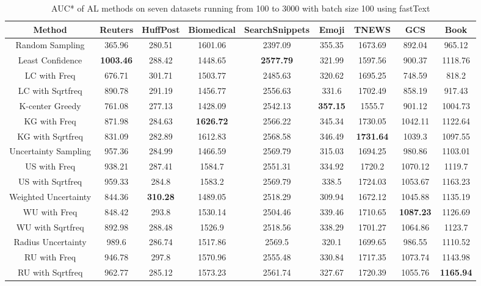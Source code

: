 \begin{table}[th]
	\centering
	\scriptsize
	\begin{tabular}{ccccccccc}
		\toprule
		Method & Reuters & HuffPost & Biomedical & SearchSnippets & Emoji & TNEWS & GCS & Book\\ \hline
		Random Sampling & 365.96 & 280.51 & 1601.06 & 2397.09 & 355.35 & 1673.69 & 892.04 & 965.12\\ \hline
		
		Least Confidence & \textbf{1003.46} & 288.42 & 1448.65 & \textbf{2577.79} & 321.99 & 1597.56 & 900.37 & 1118.76\\
		LC with Freq & 676.71 & 301.71 & 1503.77 & 2485.63 & 320.62 & 1695.25 & 748.59 & 818.2\\
		LC with Sqrtfreq & 890.78 & 291.19 & 1456.77 & 2556.63 & 331.6 & 1702.49 & 858.19 & 917.43\\  \hline
		
		K-center Greedy & 761.08 & 277.13 & 1428.09 & 2542.13 & \textbf{357.15} & 1555.7 & 901.12 & 1004.73\\
		KG with Freq & 871.98 & 284.63 & \textbf{1626.72} & 2566.22 & 345.34 & 1730.05 & 1042.11 & 1122.64\\
		KG with Sqrtfreq & 831.09 & 282.89 & 1612.83 & 2568.58 & 346.49 & \textbf{1731.64} & 1039.3 & 1097.55\\ \hline
		Uncertainty Sampling & 957.36 & 284.99 & 1466.59 & 2569.79 & 315.03 & 1694.25 & 980.86 & 1103.01\\
		US with Freq & 938.21 & 287.41 & 1584.7 & 2551.31 & 334.92 & 1720.2 & 1070.12 & 1119.7\\
		US with Sqrtfreq & 959.33 & 284.8 & 1583.2 & 2569.79 & 338.5 & 1724.03 & 1053.67 & 1163.23\\ \hline
		Weighted Uncertainty & 844.36 & \textbf{310.28} & 1489.05 & 2518.29 & 309.94 & 1672.12 & 1045.88 & 1135.19\\
		WU with Freq & 848.42 & 293.8 & 1530.14 & 2504.46 & 339.46 & 1710.65 & \textbf{1087.23} & 1126.69\\
		WU with Sqrtfreq & 892.98 & 288.48 & 1526.9 & 2518.56 & 338.29 & 1701.27 & 1064.86 & 1123.7\\ \hline
		Radius Uncertainty & 989.6 & 286.74 & 1517.86 & 2569.5 & 320.1 & 1699.65 & 986.55 & 1110.52\\
		RU with Freq & 946.78 & 297.8 & 1570.96 & 2555.48 & 330.84 & 1717.35 & 1073.74 & 1143.98\\
		RU with Sqrtfreq & 962.77 & 285.12 & 1573.23 & 2561.74 & 327.67 & 1720.39 & 1055.76 & \textbf{1165.94}\\
		\hline
	\end{tabular}
\caption{AUC* of AL methods on seven datasets running from 100 to 3000 with batch size 100 using fastText}
\label{table:auc_ft}
\end{table}


